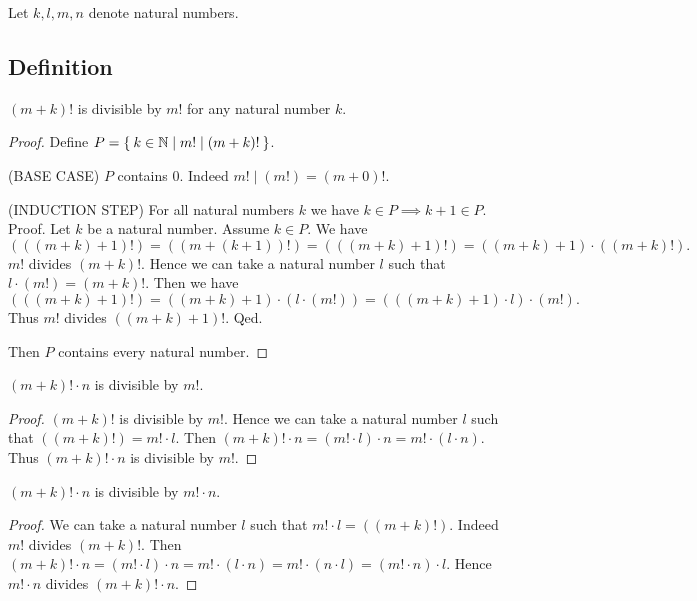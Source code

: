 \documentclass[../../arithmetic.ftl.tex]{subfiles}
\begin{document}
  \begin{forthel}
    Let $k,l,m,n$ denote natural numbers.
  \end{forthel}


  \subsection{Definition}

  \begin{forthel}
    \begin{proposition}\label{Arithmetic_03_06_805525}
      $(m + k)!$ is divisible by $m!$ for any natural number $k$.
    \end{proposition}
    \begin{proof}
      Define $P = \Set{k \in \mathbb{N} | m! \mid (m + k)!}$.

      (BASE CASE) $P$ contains $0$.
      Indeed $m! \mid (m!) = (m + 0)!$.

      (INDUCTION STEP) For all natural numbers $k$ we have $k \in P \implies k + 1 \in P$. \\
      Proof.
        Let $k$ be a natural number.
        Assume $k \in P$.
        We have
        \[  (((m + k) + 1)!)
            = ((m + (k + 1))!)
            = (((m + k) + 1)!)
            = ((m + k) + 1) \cdot ((m + k)!). \]
        $m!$ divides $(m + k)!$.
        Hence we can take a natural number $l$ such that $l \cdot (m!) = (m + k)!$.
        Then we have
        \[  (((m + k) + 1)!)
            = ((m + k) + 1) \cdot (l \cdot (m!))
            = (((m + k) + 1) \cdot l) \cdot (m!). \]
        Thus $m!$ divides $((m + k) + 1)!$.
      Qed.

      Then $P$ contains every natural number.
    \end{proof}

    \begin{corollary}\label{Arithmetic_03_06_797409}
      $(m + k)! \cdot n$ is divisible by $m!$.
    \end{corollary}
    \begin{proof}
      $(m + k)!$ is divisible by $m!$.
      Hence we can take a natural number $l$ such that $((m + k)!) = m! \cdot l$.
      Then $(m + k)! \cdot n = (m! \cdot l) \cdot n = m! \cdot (l \cdot n)$.
      Thus $(m + k)! \cdot n$ is divisible by $m!$.
    \end{proof}

    \begin{corollary}\label{Arithmetic_03_06_319523}
      $(m + k)! \cdot n$ is divisible by $m! \cdot n$.
    \end{corollary}
    \begin{proof}
      We can take a natural number $l$ such that $m! \cdot l = ((m + k)!)$.
      Indeed $m!$ divides $(m + k)!$.
      Then $(m + k)! \cdot n = (m! \cdot l) \cdot n = m! \cdot (l \cdot n) = m! \cdot (n \cdot l) = (m! \cdot n) \cdot l$.
      Hence $m! \cdot n$ divides $(m + k)! \cdot n$.
    \end{proof}


\end{forthel}
\end{document}

